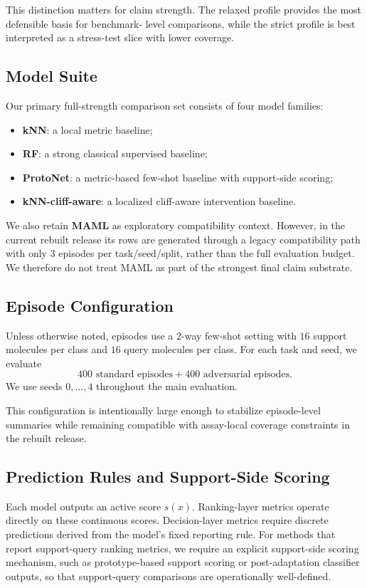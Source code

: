 \documentclass{article}
\begin{document}
This distinction matters for claim strength. The relaxed profile provides the most defensible basis for benchmark-
level comparisons, while the strict profile is best interpreted as a stress-test slice with lower coverage.

\subsection{Model Suite}

Our primary full-strength comparison set consists of four model families:
\begin{itemize}
    \item \textbf{kNN}: a local metric baseline;
    \item \textbf{RF}: a strong classical supervised baseline;
    \item \textbf{ProtoNet}: a metric-based few-shot baseline with support-side scoring;
    \item \textbf{kNN-cliff-aware}: a localized cliff-aware intervention baseline.
\end{itemize}

We also retain \textbf{MAML} as exploratory compatibility context. However, in the current rebuilt release its
rows are generated through a legacy compatibility path with only $3$ episodes per task/seed/split, rather than the
full evaluation budget. We therefore do not treat MAML as part of the strongest final claim substrate.

\subsection{Episode Configuration}

Unless otherwise noted, episodes use a $2$-way few-shot setting with $16$ support molecules per class and $16$
query molecules per class. For each task and seed, we evaluate
\[
400 \text{ standard episodes} + 400 \text{ adversarial episodes}.
\]
We use seeds $0,\dots,4$ throughout the main evaluation.

This configuration is intentionally large enough to stabilize episode-level summaries while remaining compatible
with assay-local coverage constraints in the rebuilt release.

\subsection{Prediction Rules and Support-Side Scoring}

Each model outputs an active score $s(x)$. Ranking-layer metrics operate directly on these continuous scores.
Decision-layer metrics require discrete predictions derived from the model's fixed reporting rule. For methods
that report support-query ranking metrics, we require an explicit support-side scoring mechanism, such as
prototype-based support scoring or post-adaptation classifier outputs, so that support-query comparisons are
operationally well-defined.
\end{document}
